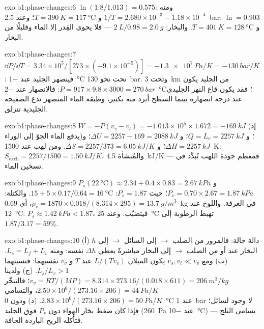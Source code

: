 \begin{solution}{exo:b1:phase-changes:6}
$\ln(1.8/1.013) = 0.575$: ومنه $1/T = 2.680 \times 10^{-3} - 1.18 \times 10^{-4}$
و $T = \qty{390}{K} = \qty{117}{\degreeCelsius}$؛ وعند \qty{2.5}{bar}: $\ln = 0.903$
و $T = \qty{401}{K} = \qty{128}{\degreeCelsius}$. والبخار: $\qty{2}{L}/0.98 =
\qty{2.0}{g}$ --- فلا يحوي القِدر إلا الماء وقليلًا من
البخار.
\end{solution}

\begin{solution}{exo:b1:phase-changes:7}
$\dd P/\dd T = 3.34 \times 10^5/[273 \times (-9.1 \times 10^{-5})] = \qty{-1.3e7}{Pa/K}
= \qty{-130}{bar/K}$: فينصهر الجليد عند \qty{-1}{\degreeCelsius} تحت نحو
\qty{130}{bar}. وتحت \qty{3}{km} من الجليد يكون $P = 917 \times 9.8 \times 3000 =
\qty{270}{bar}$: فالانصهار عند \qty{-2}{\degreeCelsius}؛ فقد يكون قاع النهر الجليدي عند
درجة انصهاره بينما السطح أبرد منه بكثير، وطبقة
الماء المنصهر تدع الصفيحة الجليدية تنزلق.
\end{solution}

\begin{solution}{exo:b1:phase-changes:8}
$W = -P(v_v - v_l) = -1.013 \times 10^5 \times 1.672 = \qty{-169}{kJ}$ (إذ يدفع الماء
الجوّ إلى الوراء)؛ و $Q = L_v = \qty{2257}{kJ}$؛ و $\Delta U = 2257 - 169
= \qty{2088}{kJ}$؛ و $\Delta H = \qty{2257}{kJ}$؛ و $\Delta S = 2257/373 = \qty{6.05}{kJ/K}$.
ومن لهب عند \qty{1500}{K}: $S_{\mathrm{exch}} = 2257/1500 = \qty{1.50}{kJ/K}$،
والمُنشأة \qty{4.5}{kJ/K} --- فمعظم جودة اللهب تُبدَّد في تسخين
الماء.
\end{solution}

\begin{solution}{exo:b1:phase-changes:9}
$P_s(\qty{22}{\degreeCelsius}) \approx 2.34 + 0.4 \times 0.83 = \qty{2.67}{kPa}$
و $P_v = 0.70 \times 2.67 = \qty{1.87}{kPa}$؛  حيث $P_s = 1.87$: $15 +
5 \times 0.17/0.64 = \qty{16}{\degreeCelsius}$. والكتلة: $\rho_v = 1870 \times 0.018/
(8.314 \times 295) = \qty{13.7}{g/m^3}$، أي \qty{0.69}{kg} في الغرفة. واللوح عند
\qty{12}{\degreeCelsius}: $P_s \approx \qty{1.42}{kPa} < 1.87$، فيتضبّب. وعند
\qty{25}{\degreeCelsius} تهبط الرطوبة إلى $1.87/3.17 = 59\%$.
\end{solution}

\begin{solution}{exo:b1:phase-changes:10}
(أ) $h$ دالة حالة: فالمرور من الصلب $\to$ إلى السائل $\to$ إلى البخار عند
 أو من الصلب $\to$ إلى البخار مباشرةً يعطي $\Delta h$ نفسه:
ومنه $L_s = L_f + L_v$. (ب) ومع $v_s, v_l \ll v_v$ يكون الميلان $L/(Tv_v)$ عند
$T$ و $v_v$ نفسيهما: فنسبتهما $L_s/L_v > 1$. (ج) ولدينا $v_v = RT/(MP) =
8.314 \times 273.16/(0.018 \times 611) = \qty{206}{m^3/kg}$؛ فالتبخّر
$2.50 \times 10^6/(273.16 \times 206) = \qty{44}{Pa/K}$، والتسامي $2.83 \times 10^6/
(273.16 \times 206) = \qty{50}{Pa/K}$. (د) ودون \qty{0}{\degreeCelsius} عند
\qty{1}{bar} لا وجود لسائل؛ فإذا كان ضغط بخار الهواء دون
$P_s$ فوق الجليد (\qty{260}{Pa} عند \qty{-10}{\degreeCelsius}) تسامى الثلج
--- فتأكله الريح الباردة الجافة.
\end{solution}

